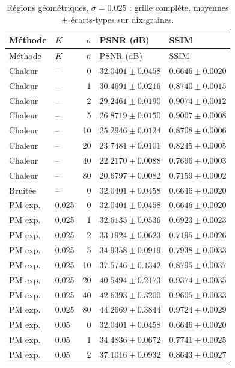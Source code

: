 \begin{longtable}{llrll}
\caption{Régions géométriques, $\sigma=0.025$ : grille complète, moyennes $\pm$ écarts-types sur dix graines.}\\
\toprule
Méthode & $K$ & $n$ & PSNR (dB) & SSIM \\
\midrule
\endfirsthead
\toprule
Méthode & $K$ & $n$ & PSNR (dB) & SSIM \\
\midrule
\endhead
\bottomrule
\endfoot
Chaleur & -- & 0 & $32.0401 \pm 0.0458$ & $0.6646 \pm 0.0020$ \\
Chaleur & -- & 1 & $30.4691 \pm 0.0216$ & $0.8740 \pm 0.0015$ \\
Chaleur & -- & 2 & $29.2461 \pm 0.0190$ & $0.9074 \pm 0.0012$ \\
Chaleur & -- & 5 & $26.8719 \pm 0.0150$ & $0.9007 \pm 0.0008$ \\
Chaleur & -- & 10 & $25.2946 \pm 0.0124$ & $0.8708 \pm 0.0006$ \\
Chaleur & -- & 20 & $23.7481 \pm 0.0101$ & $0.8245 \pm 0.0005$ \\
Chaleur & -- & 40 & $22.2170 \pm 0.0088$ & $0.7696 \pm 0.0003$ \\
Chaleur & -- & 80 & $20.6797 \pm 0.0082$ & $0.7159 \pm 0.0002$ \\
Bruitée & -- & 0 & $32.0401 \pm 0.0458$ & $0.6646 \pm 0.0020$ \\
PM exp. & 0.025 & 0 & $32.0401 \pm 0.0458$ & $0.6646 \pm 0.0020$ \\
PM exp. & 0.025 & 1 & $32.6135 \pm 0.0536$ & $0.6923 \pm 0.0023$ \\
PM exp. & 0.025 & 2 & $33.1924 \pm 0.0623$ & $0.7195 \pm 0.0026$ \\
PM exp. & 0.025 & 5 & $34.9358 \pm 0.0919$ & $0.7938 \pm 0.0033$ \\
PM exp. & 0.025 & 10 & $37.5746 \pm 0.1342$ & $0.8795 \pm 0.0037$ \\
PM exp. & 0.025 & 20 & $40.5494 \pm 0.2173$ & $0.9374 \pm 0.0035$ \\
PM exp. & 0.025 & 40 & $42.6393 \pm 0.3200$ & $0.9605 \pm 0.0033$ \\
PM exp. & 0.025 & 80 & $44.2669 \pm 0.3844$ & $0.9724 \pm 0.0029$ \\
PM exp. & 0.05 & 0 & $32.0401 \pm 0.0458$ & $0.6646 \pm 0.0020$ \\
PM exp. & 0.05 & 1 & $34.4836 \pm 0.0672$ & $0.7741 \pm 0.0025$ \\
PM exp. & 0.05 & 2 & $37.1016 \pm 0.0932$ & $0.8643 \pm 0.0027$ \\

\end{longtable}
